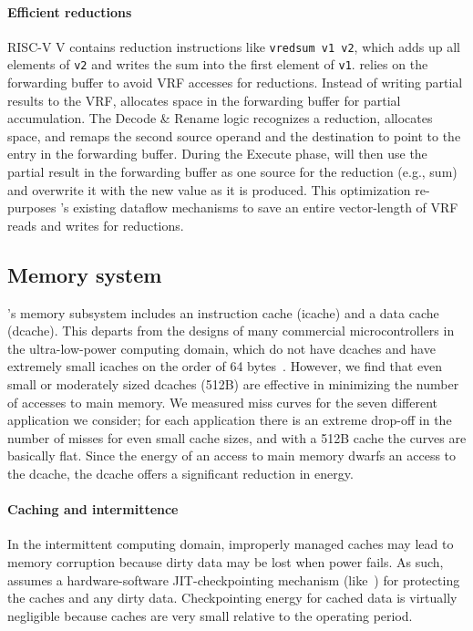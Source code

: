 \paragraph{Efficient reductions}
RISC-V V contains {reduction} instructions like \texttt{vredsum v1 v2},
which adds up all elements of \texttt{v2} and writes the sum into the first element of \texttt{v1}.
%
\manic relies on the forwarding buffer to avoid VRF accesses for reductions.
% 
Instead of writing partial results to the VRF,
\manic allocates space in the forwarding buffer for partial accumulation.
% 
The Decode \& Rename logic recognizes a reduction, allocates space, and remaps the second source operand and the destination to point to the entry in the forwarding buffer.
% 
During the Execute phase, \manic will then use the partial result in the forwarding buffer as one source for the reduction (e.g., sum)
and overwrite it with the new value as it is produced.
% 
This optimization re-purposes \manic's existing dataflow mechanisms
to save an entire vector-length of VRF reads and writes for reductions.

\subsection{Memory system}
\label{manic:manic:memory}
\manic's memory subsystem includes an instruction cache (icache) and a data cache (dcache).
%
This departs from the designs of many commercial microcontrollers 
in the ultra-low-power computing domain, which do
not have dcaches and have extremely small icaches on the order of 
64 bytes~\cite{msp430fr5994}.
%
However, we find that even small or moderately sized dcaches (512B) are effective in minimizing the number of accesses to main memory. 
%
We measured miss curves for the seven different application we consider; 
for each application there is an extreme drop-off in the number of misses for even 
small cache sizes,  and with a 512B cache the curves are basically flat.
%
Since the energy of an access to main memory dwarfs an access to the dcache,
the dcache offers a significant reduction in energy.

\paragraph{Caching and intermittence}
In the intermittent computing domain, improperly managed caches may
lead to memory corruption because dirty data may be lost when power fails.
%
As such, \manic assumes a hardware-software JIT-checkpointing mechanism
(like~\cite{hibernusplusplus, samoyed, quickrecall}) for protecting the caches
and any dirty data.
%
Checkpointing energy for cached data is virtually negligible because caches are
very small relative to the operating period. 
%


